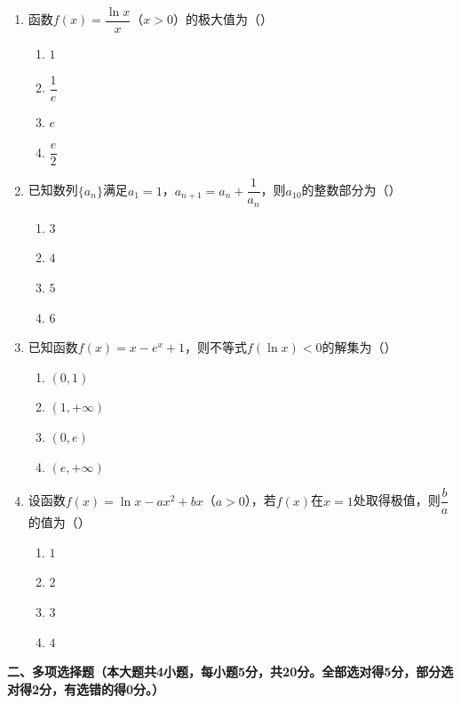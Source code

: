 \documentclass[12pt, a4paper]{ctexart}
\begin{document}
\begin{enumerate}[label=\Alph*.]
\item 函数$f(x)=\dfrac{\ln x}{x}$（$x>0$）的极大值为（\quad）
\begin{enumerate}[label=]
\item $1$ \qquad \item $\dfrac{1}{e}$ \qquad \item $e$ \qquad \item $\dfrac{e}{2}$
\end{enumerate}

\item 已知数列$\{a_n\}$满足$a_1=1$，$a_{n+1}=a_n+\dfrac{1}{a_n}$，则$a_{10}$的整数部分为（\quad）
\begin{enumerate}[label=]
\item $3$ \qquad \item $4$ \qquad \item $5$ \qquad \item $6$
\end{enumerate}

\item 已知函数$f(x)=x-e^x+1$，则不等式$f(\ln x)<0$的解集为（\quad）
\begin{enumerate}[label=]
\item $(0,1)$ \qquad \item $(1,+\infty)$ \qquad \item $(0,e)$ \qquad \item $(e,+\infty)$
\end{enumerate}

\item 设函数$f(x)=\ln x-ax^2+bx$（$a>0$），若$f(x)$在$x=1$处取得极值，则$\dfrac{b}{a}$的值为（\quad）
\begin{enumerate}[label=]
\item $1$ \qquad \item $2$ \qquad \item $3$ \qquad \item $4$
\end{enumerate}

\end{enumerate}

\vspace{0.5em}

\noindent\textbf{二、多项选择题（本大题共4小题，每小题5分，共20分。全部选对得5分，部分选对得2分，有选错的得0分。）}
\end{document}
